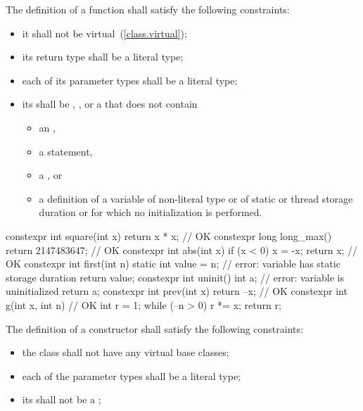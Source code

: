 \pnum
{}
The definition of a  function shall satisfy the following
constraints:

\begin{itemize}
\item
it shall not be virtual~(\ref{class.virtual});

\item
its return type shall be a literal type;

\item
each of its parameter types shall be a literal type;

\item
its  shall be
, , or
a 
that does not contain

\begin{itemize}
\item an ,
\item a  statement,
\item a , or
\item a definition of a variable
of non-literal type or
of static or thread storage duration or
for which no initialization is performed.
\end{itemize}

\end{itemize}

\enterexample
\begin{codeblock}
constexpr int square(int x) 
  { return x * x; }             // OK
constexpr long long_max() 
  { return 2147483647; }        // OK
constexpr int abs(int x) {
  if (x < 0)
    x = -x;
  return x;                     // OK
}
constexpr int first(int n) {
  static int value = n;         // error: variable has static storage duration
  return value;
}
constexpr int uninit() {
  int a;                        // error: variable is uninitialized
  return a;
}
constexpr int prev(int x)
  { return --x; }               // OK
constexpr int g(int x, int n) { // OK
  int r = 1;
  while (--n > 0) r *= x;
  return r;
}
\end{codeblock}
\exitexample

\pnum
{}%
The definition of a  constructor shall satisfy the
following constraints:

\begin{itemize}
\item
the class shall not have any virtual base classes;

\item
each of the parameter types shall be a literal type;

\item
its  shall not be a ;
\end{itemize}

